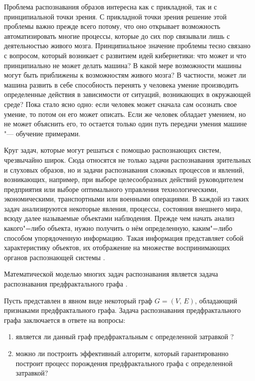 \small


Проблема распознавания образов интересна как с прикладной, так и с принципиальной точки зрения. С прикладной точки зрения решение
этой проблемы важно прежде всего потому, что оно открывает возможность автоматизировать многие процессы, которые до сих пор
связывали лишь с деятельностью живого мозга. Принципиальное значение проблемы тесно связано с вопросом, который возникает с
развитием идей кибернетики: что может и что принципиально не может делать машина? В какой мере возможности машины могут быть
приближены к возможностям живого мозга? В частности, может ли машина развить в себе способность перенять у человека умение
производить определенные действия в зависимости от ситуаций, возникающих в окружающей среде? Пока стало ясно одно: если
человек может сначала сам осознать свое умение, то потом он его может описать. Если же человек обладает умением, но не может
объяснить его, то остается только один путь передачи умения машине "--- обучение примерами.

Круг задач, которые могут решаться с помощью распознающих систем, чрезвычайно широк. Сюда относятся не только задачи
распознавания зрительных и слуховых образов, но и задачи распознавания сложных процессов и явлений, возникающих, например, при
выборе целесообразных действий руководителем предприятия или выборе оптимального управления технологическими, экономическими,
транспортными или военными операциями. В каждой из таких задач анализируются некоторые явления, процессы, состояния внешнего
мира, всюду далее называемые объектами наблюдения. Прежде чем начать анализ какого"=либо объекта, нужно получить о нём
определенную, каким"=либо способом упорядоченную информацию. Такая информация представляет собой характеристику объектов, их
отображение на множестве воспринимающих органов распознающей системы \cite{utakaeva:bib1}.

Математической моделью многих задач распознавания является задача распознавания предфрактального графа \cite{utakaeva:bib2}.

Пусть представлен в явном виде некоторый граф  $G=(V,\,E)$, обладающий признаками предфрактального графа. Задача распознавания
предфрактального графа заключается в ответе на вопросы:
\begin{enumerate}
\item является ли данный граф предфрактальным с определенной затравкой \cite{utakaeva:bib2}?

\item можно ли построить эффективный алгоритм, который гарантированно построит процесс порождения предфрактального графа с
определенной затравкой?
\end{enumerate}


